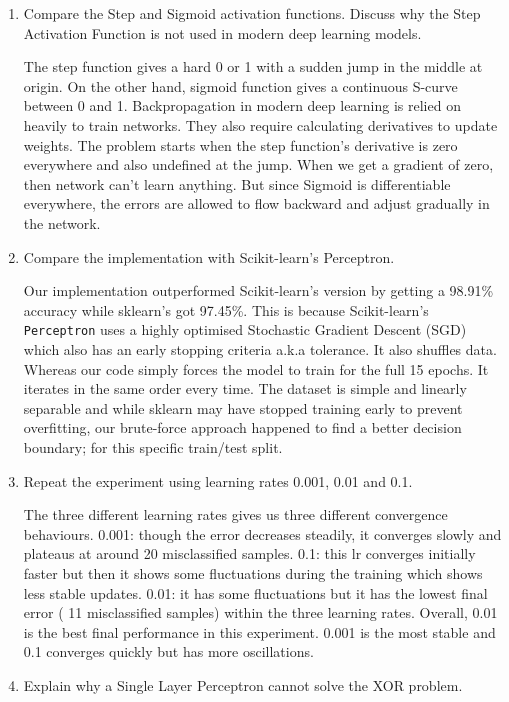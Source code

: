 \documentclass[11pt]{article}
\begin{document}
\begin{enumerate}[leftmargin=*]
\item Compare the Step and Sigmoid activation functions. Discuss why the Step Activation Function is not used in modern deep learning models.

The step function gives a hard 0 or 1 with a sudden jump in the middle at origin. On the other hand, sigmoid function gives a continuous S-curve between 0 and 1. Backpropagation in modern deep learning is relied on heavily to train networks. They also require calculating derivatives to update weights. The problem starts when the step function's derivative is zero everywhere and also undefined at the jump. When we get a gradient of zero, then network can't learn anything. But since Sigmoid is differentiable everywhere, the errors are allowed to flow backward and adjust gradually in the network.

\item Compare the implementation with Scikit-learn's Perceptron.

Our implementation outperformed Scikit-learn's version by getting a 98.91\% accuracy while sklearn's got 97.45\%. This is because Scikit-learn's \texttt{Perceptron} uses a highly optimised Stochastic Gradient Descent (SGD) which also has an early stopping criteria a.k.a tolerance. It also shuffles data. Whereas our code simply forces the model to train for the full 15 epochs. It iterates in the same order every time. The dataset is simple and linearly separable  and while sklearn may have stopped training early to prevent overfitting, our brute-force approach happened to find a better decision boundary; for this specific train/test split.

\item Repeat the experiment using learning rates 0.001, 0.01 and 0.1.

The three different learning rates gives us three different convergence behaviours. 0.001: though the error decreases steadily, it converges slowly and plateaus at around 20 misclassified samples. 0.1: this lr converges  initially faster but then it shows some fluctuations during the training which shows less stable updates. 0.01: it has some fluctuations but it has  the lowest final error ( 11 misclassified samples) within the three learning rates. Overall, 0.01 is the best final performance in this experiment. 0.001 is the most stable and 0.1 converges quickly but has more oscillations.

\item Explain why a Single Layer Perceptron cannot solve the XOR problem.


\end{enumerate}
\end{document}
